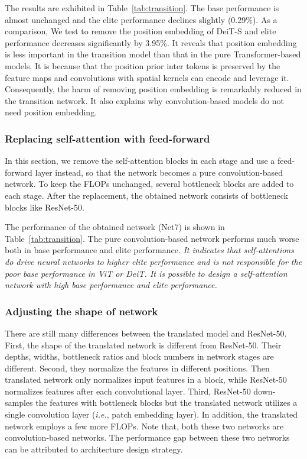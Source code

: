 \documentclass[10pt,twocolumn,letterpaper]{article}
\begin{document}
The results are exhibited in Table~\ref{tab:transition}. The base performance is almost unchanged and the elite performance declines slightly (0.29\%). As a comparison, We test to remove the position embedding of DeiT-S and elite performance decreases significantly by 3.95\%. It reveals that position embedding is less important in the transition model than that in the pure Transformer-based models. It is because that the position prior inter tokens is preserved by the feature maps and convolutions with spatial kernels can encode and leverage it. Consequently, the harm of removing position embedding is remarkably reduced in the transition network. It also explains why convolution-based models do not need position embedding.

\subsubsection{Replacing self-attention with feed-forward}
\label{methodology:transition:feedforward}

In this section, we remove the self-attention blocks in each stage and use a feed-forward layer instead, so that the network becomes a pure convolution-based network. To keep the FLOPs unchanged, several bottleneck blocks are added to each stage. After the replacement, the obtained network consists of bottleneck blocks like ResNet-50. 

The performance of the obtained network (Net7) is shown in Table~\ref{tab:transition}. The pure convolution-based network performs much worse both in base performance and elite performance. \textit{It indicates that self-attentions do drive neural networks to higher elite performance and is not responsible for the poor base performance in ViT or DeiT. It is possible to design a self-attention network with high base performance and elite performance.} 

\subsubsection{Adjusting the shape of network}
\label{methodology:transition:shape}

There are still many differences between the translated model and ResNet-50. First, the shape of the translated network is different from ResNet-50. Their depths, widths, bottleneck ratios and block numbers in network stages are different. Second, they normalize the features in different positions. Then translated network only normalizes input features in a block, while ResNet-50 normalizes features after each convolutional layer. Third, ResNet-50 down-samples the features with bottleneck blocks but the translated network utilizes a single convolution layer (\textit{i.e.}, patch embedding layer). In addition, the translated network employs a few more FLOPs. Note that, both these two networks are convolution-based networks. The performance gap between these two networks can be attributed to architecture design strategy. 
\end{document}
